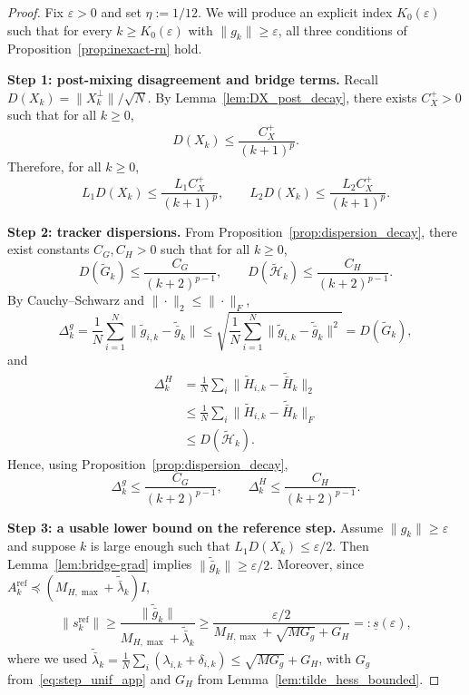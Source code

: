 \documentclass[review,onefignum,onetabnum]{siamart171218}
\begin{document}
\begin{proof}
Fix $\varepsilon>0$ and set $\eta:=1/12$.
We will produce an explicit index $K_0(\varepsilon)$ such that for every $k\ge K_0(\varepsilon)$ with $\|g_k\|\ge \varepsilon$,
all three conditions of Proposition~\ref{prop:inexact-rn} hold.

\smallskip
\noindent\textbf{Step 1: post-mixing disagreement and bridge terms.}
Recall $D(X_k)=\|X_k^\perp\|/\sqrt N$.
By Lemma~\ref{lem:DX_post_decay}, there exists $C_X^{+}>0$ such that for all $k\ge 0$,
\begin{equation}\label{eq:DX_post_decay_app}
D(X_k)\le \frac{C_X^{+}}{(k+1)^p}.
\end{equation}
Therefore, for all $k\ge 0$,
\begin{equation}\label{eq:bridge_targets_app}
L_1D(X_k)\le \frac{L_1C_X^{+}}{(k+1)^p},
\qquad
L_2D(X_k)\le \frac{L_2C_X^{+}}{(k+1)^p}.
\end{equation}

\smallskip
\noindent\textbf{Step 2: tracker dispersions.}
From Proposition~\ref{prop:dispersion_decay}, there exist constants $C_G,C_H>0$ such that for all $k\ge 0$,
\begin{equation}\label{eq:GH_decay_app}
D(\tilde G_k)\le \frac{C_G}{(k+2)^{p-1}},
\qquad
D(\tilde{\mathcal H}_k)\le \frac{C_H}{(k+2)^{p-1}}.
\end{equation}
By Cauchy--Schwarz and $\|\cdot\|_2\le \|\cdot\|_F$,
\[
\Delta_k^g
=\frac1N\sum_{i=1}^N\|\tilde g_{i,k}-\tilde{\bar g}_k\|
\le \sqrt{\frac1N\sum_{i=1}^N\|\tilde g_{i,k}-\tilde{\bar g}_k\|^2}
= D(\tilde G_k),
\]
and
\begin{align*}
\Delta_k^H
&=\tfrac1N\textstyle\sum_{i}\big\|\tilde H_{i,k}\!-\!\tilde{\bar H}_k\big\|_2\\
&\le \tfrac1N\textstyle\sum_{i}\big\|\tilde H_{i,k}\!-\!\tilde{\bar H}_k\big\|_F\\
&\le D(\tilde{\mathcal H}_k).
\end{align*}
Hence, using Proposition~\ref{prop:dispersion_decay},
\begin{equation}\label{eq:Delta_decay_app}
\Delta_k^g\le \frac{C_G}{(k+2)^{p-1}},
\qquad
\Delta_k^H\le \frac{C_H}{(k+2)^{p-1}}.
\end{equation}

\smallskip
\noindent\textbf{Step 3: a usable lower bound on the reference step.}
Assume $\|g_k\|\ge \varepsilon$ and suppose $k$ is large enough such that $L_1D(X_k)\le \varepsilon/2$.
Then Lemma~\ref{lem:bridge-grad} implies
$\|\tilde{\bar g}_k\|\ge \varepsilon/2$.
Moreover, since $A_k^{\mathrm{ref}}\preceq (M_{H,\max}+\tilde{\bar\lambda}_k)I$,
\[
\|s_k^{\mathrm{ref}}\|
\ge \frac{\|\tilde{\bar g}_k\|}{M_{H,\max}+\tilde{\bar\lambda}_k}
\ge \frac{\varepsilon/2}{M_{H,\max}+\sqrt{MG_g}+G_H}
=:\underline s(\varepsilon),
\]
where we used $\tilde{\bar\lambda}_k=\frac{1}{N}\sum_i(\lambda_{i,k}+\delta_{i,k})\le \sqrt{MG_g}+G_H$, with $G_g$ from~\eqref{eq:step_unif_app} and $G_H$ from Lemma~\ref{lem:tilde_hess_bounded}.


\end{proof}
\end{document}
